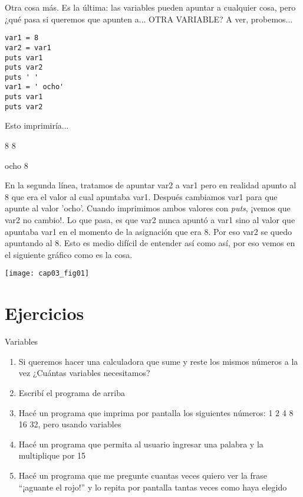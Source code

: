 Otra cosa más. Es la última: las variables pueden apuntar a cualquier cosa, pero ¿qué pasa si queremos que apunten a... OTRA VARIABLE?   A ver, probemos...

\begin{lstlisting}
var1 = 8
var2 = var1
puts var1
puts var2
puts ' '
var1 = ' ocho'
puts var1
puts var2
\end{lstlisting}

Esto imprimiría... 

\begin{console-output}
8
8

ocho
8
\end{console-output}

En la segunda línea, tratamos de apuntar var2 a var1 pero en realidad apunto al 8 que era el valor al cual apuntaba var1. Después cambiamos var1 para que apunte al valor 'ocho'. Cuando imprimimos ambos valores con \emph{puts}, ¡vemos que var2 no cambio!. Lo que pasa, es que var2 nunca apuntó a var1 sino al valor que apuntaba var1 en el momento de la asignación que era 8. Por eso var2 se quedo apuntando al 8. Esto es medio difícil de entender así como así, por eso vemos en el siguiente gráfico como es la cosa.

\begin{center}
\texttt{[image: cap03\_fig01]}
\end{center}

\section{Ejercicios}
\begin{ejercicio}{Variables}{
\begin{enumerate}
  \item Si queremos hacer una calculadora que sume y reste los mismos números a la vez ¿Cuántas variables necesitamos?
  \item Escribí el programa de arriba
  \item Hacé un programa que imprima por pantalla los siguientes números: 1 2 4 8 16 32, pero usando variables
  \item Hacé un programa que permita al usuario ingresar una palabra y la multiplique por 15
  \item Hacé un programa que me pregunte cuantas veces quiero ver la frase “¡aguante el rojo!” y lo repita por pantalla tantas veces como haya elegido
\end{enumerate} 
}
\end{ejercicio}

